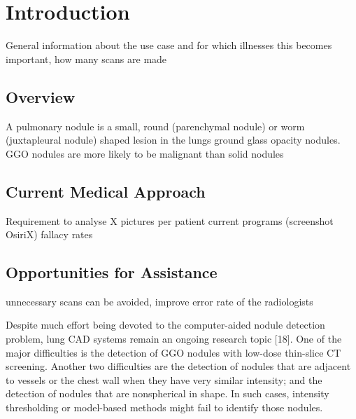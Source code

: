 \documentclass[main.tex]{subfiles}
\begin{document}
\chapter{Introduction}
General information about the use case and for which illnesses this becomes important, how many scans are made
\section{Overview}
 A pulmonary nodule is a small, round (parenchymal nodule) or worm (juxtapleural nodule) shaped lesion in the lungs
 ground glass opacity nodules.
 GGO nodules are more likely to be malignant than solid nodules
\section{Current Medical Approach}
Requirement to analyse X pictures per patient
current programs (screenshot OsiriX)
fallacy rates 
\section{Opportunities for Assistance}
unnecessary scans can be avoided, improve error rate of the radiologists

Despite much effort being devoted to the computer-aided nodule detection problem, lung CAD systems remain an ongoing
research topic [18]. One of the major difficulties is the detection of GGO nodules with low-dose thin-slice CT screening. Another two difficulties are the detection of nodules that are adjacent to vessels or the chest wall when they have very similar intensity; and the detection of nodules that are nonspherical in shape. In such cases, intensity thresholding or model-based methods might fail to identify those nodules.
\end{document}

